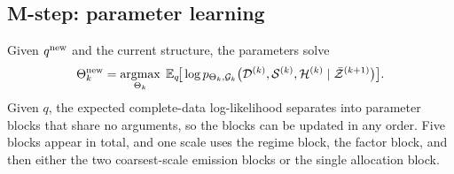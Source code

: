 \subsection{M-step: parameter learning}
\label{sec:learning:mstep}

Given $q^{\mathrm{new}}$ and the current structure, the parameters solve
\begin{align}
\Theta_k^{\mathrm{new}}
=
\operatorname*{argmax}_{\Theta_k}
\;
\mathbb{E}_q\!\big[\log p_{\Theta_k,{\mathcal{G}}_k}\big({\mathcal{D}}^{(k)},{\mathcal{S}}^{(k)},{\mathcal{H}}^{(k)} \mid \bar{{\mathcal{Z}}}^{(k+1)}\big)\big].
\label{eq:learn_mstep}
\end{align}
Given $q$, the expected complete-data log-likelihood separates into parameter blocks that share no
arguments, so the blocks can be updated in any order. Five blocks appear in total, and one scale
uses the regime block, the factor block, and then either the two coarsest-scale emission blocks or
the single allocation block.

